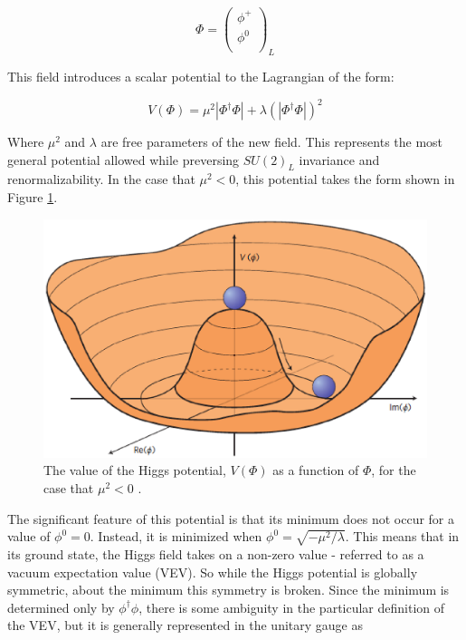 \begin{equation}
  \label{eq:phiDoublet}
  \Phi = 
  \begin{pmatrix}                                                                                                           
    \phi^+ \\                                                                                                               
    \phi^0 \\                                                                                                                            
  \end{pmatrix}_L                                                                                                                    
\end{equation}

This field introduces a scalar potential to the Lagrangian of the form:

\begin{equation}
  \label{eq:higgsV}
  V(\Phi) = \mu^2|\Phi^\dagger\Phi| + \lambda (|\Phi^\dagger \Phi|)^2
\end{equation}

Where $\mu^2$ and $\lambda$ are free parameters of the new field. This represents the most general potential allowed while preversing $SU(2)_L$ invariance and renormalizability. In the case that $\mu^2 < 0$, this potential takes the form shown in Figure \ref{fig:higgspotential}.

\begin{figure}[H]
\centering
   \includegraphics[width=0.75\linewidth]{figures/theory/higgspotential.eps}
\caption{The value of the Higgs potential, $V(\Phi)$ as a function of $\Phi$, for the case that $\mu^2 < 0$ \cite{Ellis:1638469}.}
\label{fig:higgspotential}
\end{figure}

The significant feature of this potential is that its minimum does not occur for a value of $\phi^0 = 0$. Instead, it is minimized when $\phi^0 = \sqrt{-\mu^2/\lambda}$. This means that in its ground state, the Higgs field takes on a non-zero value - referred to as a vacuum expectation value (VEV). So while the Higgs potential is globally symmetric, about the minimum this symmetry is broken. Since the minimum is determined only by $\phi^\dagger \phi$, there is some ambiguity in the particular definition of the VEV, but it is generally represented in the unitary gauge as 

